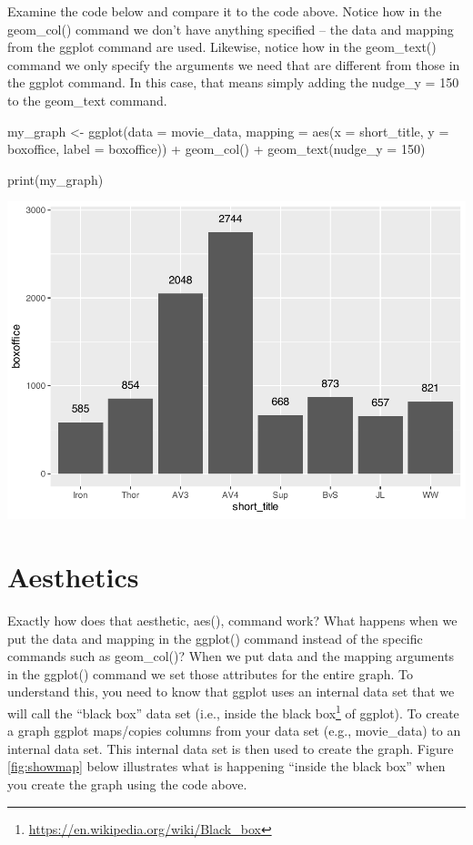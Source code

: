\documentclass[
]{krantz}
\makeatletter
\newenvironment{Shaded}{\begin{snugshade}}{\end{snugshade}}
\newcommand{\AttributeTok}[1]{\textcolor[rgb]{0.61,0.61,0.61}{#1}}
\newcommand{\DecValTok}[1]{\textcolor[rgb]{0.06,0.06,0.06}{#1}}
\newcommand{\FunctionTok}[1]{\textcolor[rgb]{0,0,0}{#1}}
\newcommand{\NormalTok}[1]{#1}
\newcommand{\OtherTok}[1]{\textcolor[rgb]{0.37,0.37,0.37}{#1}}
\newcommand{\SpecialCharTok}[1]{\textcolor[rgb]{0,0,0}{#1}}
\renewcommand{\href}[2]{#2\footnote{\url{#1}}}
\newenvironment{kframe}{%
\medskip{}
\setlength{\fboxsep}{.8em}
 \def\at@end@of@kframe{}%
 \ifinner\ifhmode%
  \def\at@end@of@kframe{\end{minipage}}%
  \begin{minipage}{\columnwidth}%
 \fi\fi%
 \def\FrameCommand##1{\hskip\@totalleftmargin \hskip-\fboxsep
 \colorbox{shadecolor}{##1}\hskip-\fboxsep
     \hskip-\linewidth \hskip-\@totalleftmargin \hskip\columnwidth}%
 \MakeFramed {\advance\hsize-\width
   \@totalleftmargin\z@ \linewidth\hsize
   \@setminipage}}%
 {\par\unskip\endMakeFramed%
 \at@end@of@kframe}
\renewenvironment{Shaded}{\begin{kframe}}{\end{kframe}}
\makeatother
\begin{document}
Examine the code below and compare it to the code above. Notice how in the geom\_col() command we don't have anything specified -- the data and mapping from the ggplot command are used. Likewise, notice how in the geom\_text() command we only specify the arguments we need that are different from those in the ggplot command. In this case, that means simply adding the nudge\_y = 150 to the geom\_text command.

\begin{Shaded}
\begin{Highlighting}[]
\NormalTok{my\_graph }\OtherTok{\textless{}{-}} \FunctionTok{ggplot}\NormalTok{(}\AttributeTok{data =}\NormalTok{ movie\_data,}
           \AttributeTok{mapping =} \FunctionTok{aes}\NormalTok{(}\AttributeTok{x =}\NormalTok{ short\_title,}
                         \AttributeTok{y =}\NormalTok{ boxoffice,}
                         \AttributeTok{label =}\NormalTok{ boxoffice)) }\SpecialCharTok{+}
  \FunctionTok{geom\_col}\NormalTok{() }\SpecialCharTok{+}
  \FunctionTok{geom\_text}\NormalTok{(}\AttributeTok{nudge\_y =} \DecValTok{150}\NormalTok{) }

\FunctionTok{print}\NormalTok{(my\_graph)}
\end{Highlighting}
\end{Shaded}

\includegraphics[width=0.65\linewidth]{bookdown_files/figure-latex/unnamed-chunk-112-1}

\hypertarget{aesthetics}{%
\section{Aesthetics}\label{aesthetics}}

Exactly how does that aesthetic, aes(), command work? What happens when we put the data and mapping in the ggplot() command instead of the specific commands such as geom\_col()? When we put data and the mapping arguments in the ggplot() command we set those attributes for the entire graph. To understand this, you need to know that ggplot uses an internal data set that we will call the ``black box'' data set (i.e., inside the \href{https://en.wikipedia.org/wiki/Black_box}{black box} of ggplot). To create a graph ggplot maps/copies columns from your data set (e.g., movie\_data) to an internal data set. This internal data set is then used to create the graph. Figure \ref{fig:showmap} below illustrates what is happening ``inside the black box'' when you create the graph using the code above.
\end{document}

